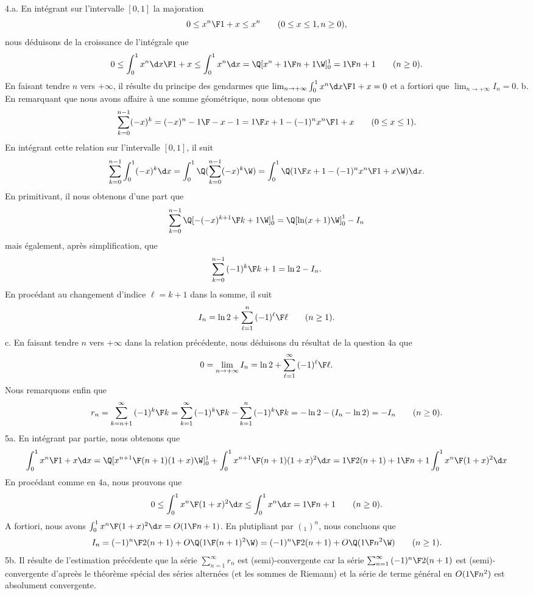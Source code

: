 \medskip\noindent
4.a. En intégrant sur l'intervalle $[0,1]$ la majoration 
$$
0\le {x^n\F 1+x}\le x^n\qquad (0\le x\le 1, n\ge0),
$$
nous déduisons de la croissance de l'intégrale que 
$$
0\le \int_0^1{x^n\d x\F1+x}\le \int_0^1x^n\d x=\Q[{x^n+1\F n+1}\W]_0^1={1\F n+1}\qquad(n\ge0).
$$
En faisant tendre $n$ vers $+\infty$, il r\'esulte du principe des gendarmes que $\lim_{n\to+\infty}\int_0^1{x^n\d x\F1+x}=0$ et a fortiori que $\lim_{n\to+\infty}I_n=0$. 
\bigskip\noindent
b. En remarquant que nous avons affaire à une somme géométrique, nous obtenons que 
$$
\sum_{k=0}^{n-1}(-x)^k={(-x)^n-1\F -x-1}={1\F x+1}-(-1)^n{x^n\F 1+x}\qquad (0\le x\le 1).
$$
En intégrant cette relation sur l'intervalle $[0,1]$, il suit 
$$
\sum_{k=0}^{n-1}\int_0^1(-x)^k\d x=\int_0^1\Q(\sum_{k=0}^{n-1}(-x)^k\W)=\int_0^1\Q({1\F x+1}-(-1)^n{x^n\F 1+x}\W)\d x.
$$
En primitivant, il nous obtenons d'une part que 
$$
\sum_{k=0}^{n-1}\Q[-{(-x)^{k+1}\F k+1}\W]_0^1=\Q[\ln(x+1)\W]_0^1-I_n
$$
mais également, après simplification, que 
$$
\sum_{k=0}^{n-1}{(-1)^{k}\F k+1}=\ln2-I_n.
$$
En procédant au changement d'indice $\ell=k+1$ dans la somme, il suit
$$
I_n=\ln 2+ \sum_{\ell=1}^n{(-1)^\ell\F\ell}\qquad(n\ge1).
$$
c. En faisant tendre $n$ vers $+\infty$ dans la relation précédente, nous déduisons du résultat de la question 4a que 
$$
0=\lim_{n\to+\infty}I_n=\ln 2+\sum_{\ell=1}^\infty{(-1)^\ell\F\ell}.
$$
Nous remarquons enfin que 
$$
r_n=\sum_{k=n+1}^\infty{(-1)^{k}\F k}=\sum_{k=1}^\infty{(-1)^{k}\F k}-\sum_{k=1}^n{(-1)^{k}\F k}=-\ln2-(I_n-\ln 2)=-I_n\qquad(n\ge0).
$$
5a. En intégrant par partie, nous obtenons que 
$$
\int_0^1{x^n\F 1+x}\d x=\Q[{x^{n+1}\F (n+1)(1+x)}\W]_0^1+\int_0^1{x^{n+1}\F(n+1)(1+x)^2}\d x={1\F 2(n+1)}+{1\F n+1}\int_0^1{x^n\F (1+x)^2}\d x
$$
En procédant comme en 4a, nous prouvons que 
$$
0\le \int_0^1{x^n\F (1+x)^2}\d x\le \int_0^1x^n\d x={1\F n+1}\qquad (n\ge0).
$$
A fortiori, nous avons $\int_0^1{x^n\F (1+x)^2}\d x=O({1\F n+1})$. En plutipliant par $(_1)^n$, nous concluons que 
$$
I_n={(-1)^n\F 2(n+1)}+O\Q({1\F (n+1)^2}\W)={(-1)^n\F 2(n+1)}+O\Q({1\F n^2}\W) \qquad (n\ge 1).
$$
5b. Il résulte de l'estimation précédente que la série $\sum_{n=1}^\infty r_n$ est (semi)-convergente car la série $\sum_{n=1}^\infty{(-1)^n\F 2(n+1)}$ est (semi)-convergente d'apreès le théorème spécial des séries alternées (et les sommes de Riemann) et la série de terme général en $O({1\F n^2})$ est absolument convergente. 

\bye
